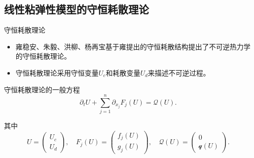 \documentclass[mathserif]{beamer}
\begin{document}
\subsection{线性粘弹性模型的守恒耗散理论}
\begin{frame}{守恒耗散理论}
\pause
\begin{itemize}
\item  雍稳安、朱毅、洪柳、杨再宝基于雍提出的守恒耗散结构提出了不可逆热力学的守恒耗散理论。
\pause
\item  守恒耗散理论采用守恒变量$U_c$和耗散变量$U_d$来描述不可逆过程。
\end{itemize}
\pause
\begin{block}{守恒耗散理论的一般方程}
	\begin{equation*}%
		\partial_t U + \sum_{j=1}^n \partial_{x_j} F_j(U) = \mathcal{Q} (U) .
	\end{equation*}
\end{block}
	其中
	\begin{equation*}
		U = \left( \begin{array}{c}
			U_c \\ U_d 
			\end{array} \right) , \quad
			F_j(U)= \left( \begin{array}{c}
			f_j(U) \\ g_j(U)
			\end{array} \right), \quad 
			\mathcal{Q}(U) = \left( \begin{array}{c}
			0 \\ \mathcal{q} (U) 
			\end{array} \right).
	\end{equation*}
	\end{frame}
\end{document}
